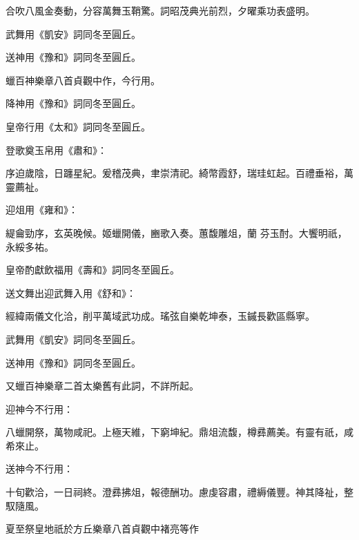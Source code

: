\begin{pinyinscope}
 合吹八風金奏動，分容萬舞玉鞘驚。詞昭茂典光前烈，夕曜乘功表盛明。



 武舞用《凱安》詞同冬至圓丘。



 送神用《豫和》詞同冬至圓丘。



 蠟百神樂章八首貞觀中作，今行用。



 降神用《豫和》詞同冬至圓丘。



 皇帝行用《太和》詞同冬至圓丘。



 登歌奠玉帛用《肅和》：



 序迫歲陰，日躔星紀。爰稽茂典，聿崇清祀。綺幣霞舒，瑞珪虹起。百禮垂裕，萬靈薦祉。



 迎俎用《雍和》：



 緹龠勁序，玄英晚候。姬蠟開儀，豳歌入奏。蕙馥雕俎，蘭
 芬玉酎。大饗明祇，永綏多祐。



 皇帝酌獻飲福用《壽和》詞同冬至圓丘。



 送文舞出迎武舞入用《舒和》：



 經緯兩儀文化洽，削平萬域武功成。瑤弦自樂乾坤泰，玉鏚長歡區縣寧。



 武舞用《凱安》詞同冬至圓丘。



 送神用《豫和》詞同冬至圓丘。



 又蠟百神樂章二首太樂舊有此詞，不詳所起。



 迎神今不行用：



 八蠟開祭，萬物咸祀。上極天維，下窮坤紀。鼎俎流馥，樽彞薦美。有靈有祇，咸希來止。



 送神今不行用：



 十旬歡洽，一日祠終。澄彞拂俎，報德酬功。慮虔容肅，禮縟儀豐。神其降祉，整馭隨風。



 夏至祭皇地祇於方丘樂章八首貞觀中褚亮等作




\end{pinyinscope}
